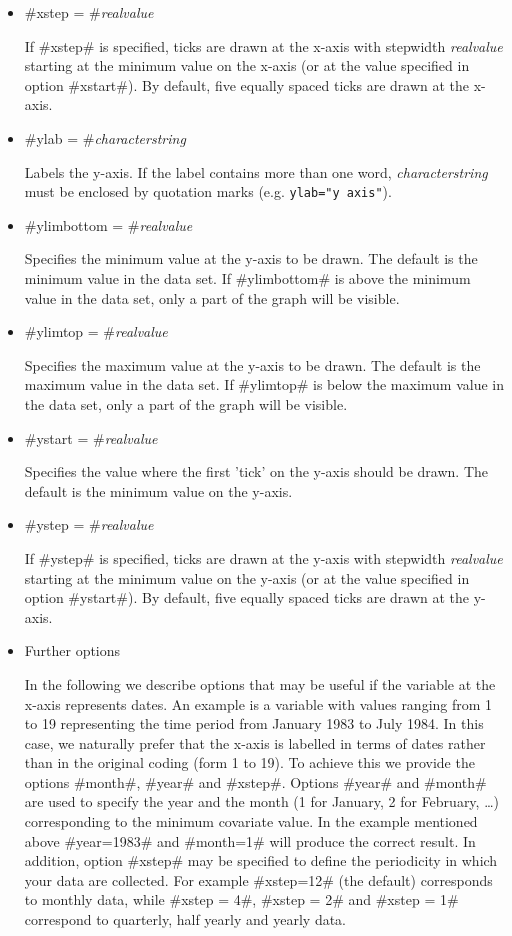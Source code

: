 \begin{itemize}
\item #xstep = #{\em realvalue}

If #xstep# is specified,  ticks are drawn at the x-axis with
stepwidth {\em realvalue} starting at the minimum value on the
x-axis (or at the value specified in option #xstart#). By default,
five equally spaced ticks are drawn at the x-axis.

\item #ylab = #{\em characterstring}

Labels the y-axis. If the label contains more than one word, {\em
characterstring} must be enclosed by quotation marks (e.g.
\texttt{ylab="y axis"}).

\item #ylimbottom = #{\em realvalue}

Specifies the minimum value at the y-axis to be drawn. The default
is the minimum value in the data set. If #ylimbottom# is above the
minimum value in the data set, only a part of the  graph will be
visible.

\item #ylimtop = #{\em realvalue}

Specifies the maximum value at the y-axis to be drawn. The default
is the maximum value in the data set. If #ylimtop# is below the
maximum value in the data set, only a part of the  graph will be
visible.

\item #ystart = #{\em realvalue}

Specifies the value where the first 'tick' on the y-axis should be
drawn. The default is the minimum value on the y-axis.

\item #ystep = #{\em realvalue}

If #ystep# is specified,  ticks are drawn at the y-axis with
stepwidth {\em realvalue} starting at the minimum value on the
y-axis (or at the value specified in option #ystart#). By default,
five equally spaced ticks are drawn at the y-axis.

\item Further options

In the following we describe options that may be useful if the
variable at the x-axis represents dates. An example is a variable
with values ranging from 1 to 19 representing the time period from
January 1983 to July 1984. In this case, we naturally prefer that
the x-axis is labelled in terms of dates rather than in the
original coding (form 1 to 19). To achieve this we provide the
options #month#, #year# and #xstep#. Options #year# and #month#
are used to specify the year and the month (1 for January, 2 for
February, \dots) corresponding to the minimum covariate value. In
the example mentioned above #year=1983# and #month=1# will produce
the correct result. In addition, option #xstep# may be specified
to define the periodicity in which your data are collected. For
example #xstep=12# (the default) corresponds to monthly data,
while #xstep = 4#, #xstep = 2# and #xstep = 1# correspond to
quarterly, half yearly and yearly data.
\end{itemize}


